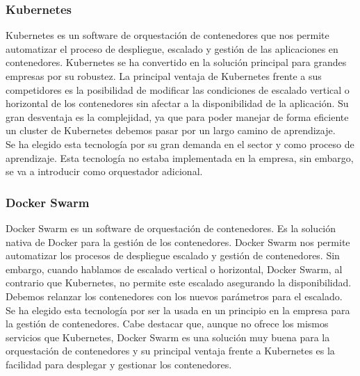                 \subsubsection{Kubernetes}
                \begin{text}
                        Kubernetes es un software de orquestación de contenedores que nos permite automatizar el proceso de despliegue, escalado y gestión de las aplicaciones en contenedores. Kubernetes se ha convertido en la solución principal para grandes empresas por su robustez. La principal ventaja de Kubernetes frente a sus competidores es la posibilidad de modificar las condiciones de escalado vertical o horizontal de los contenedores sin afectar a la disponibilidad de la aplicación. Su gran desventaja es la complejidad, ya que para poder manejar de forma eficiente un cluster de Kubernetes debemos pasar por un largo camino de aprendizaje. \\
                        Se ha elegido esta tecnología por su gran demanda en el sector y como proceso de aprendizaje. Esta tecnología no estaba implementada en la empresa, sin embargo, se va a introducir como orquestador adicional.
                \end{text}
                \subsubsection{Docker Swarm}
                \begin{text}
                        Docker Swarm es un software de orquestación de contenedores. Es la solución nativa de Docker para la gestión de los contenedores. Docker Swarm nos permite automatizar los procesos de despliegue escalado y gestión de contenedores. Sin embargo, cuando hablamos de escalado vertical o horizontal, Docker Swarm, al contrario que Kubernetes, no permite este escalado asegurando la disponibilidad. Debemos relanzar los contenedores con los nuevos parámetros para el escalado. \\
                        Se ha elegido esta tecnología por ser la usada en un principio en la empresa para la gestión de contenedores. Cabe destacar que, aunque no ofrece los mismos servicios que Kubernetes, Docker Swarm es una solución muy buena para la orquestación de contenedores y su principal ventaja frente a Kubernetes es la facilidad para desplegar y gestionar los contenedores.
                \end{text}
